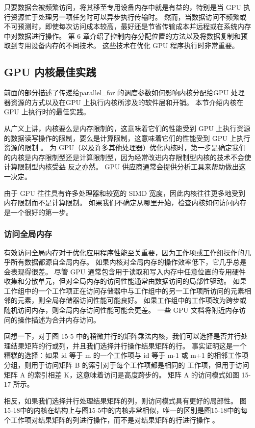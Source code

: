 只要数据会被频繁访问，将其移至专用设备内存中就是有益的，特别是当 GPU 执行资源忙于处理另一项任务时可以异步执行传输时。 然而，当数据访问不频繁或不可预测时，即使每次访问成本较高，最好还是节省传输成本并远程或在系统内存中对数据进行操作。 第 6 章介绍了控制内存分配位置的方法以及将数据复制和预取到专用设备内存的不同技术。 这些技术在优化 GPU 程序执行时非常重要。

\subsection{GPU 内核最佳实践}
前面的部分描述了传递给parallel\_for 的调度参数如何影响内核分配给GPU 处理器资源的方式以及在GPU 上执行内核所涉及的软件层和开销。 本节介绍内核在 GPU 上执行时的最佳实践。

从广义上讲，内核要么是内存限制的，这意味着它们的性能受到 GPU 上执行资源的数据读写操作的限制，要么是计算限制，这意味着它们的性能受到 GPU 上执行资源的限制 。 为 GPU（以及许多其他处理器）优化内核时，第一步是确定我们的内核是内存限制型还是计算限制型，因为经常改进内存限制型内核的技术不会使计算限制型内核受益 反之亦然。 GPU 供应商通常会提供分析工具来帮助做出这一决定。

由于 GPU 往往具有许多处理器和较宽的 SIMD 宽度，因此内核往往更多地受到内存限制而不是计算限制。 如果我们不确定从哪里开始，检查内核如何访问内存是一个很好的第一步。

\subsubsection{访问全局内存}
有效访问全局内存对于优化应用程序性能至关重要，因为工作项或工作组操作的几乎所有数据都源自全局内存。 如果内核对全局内存的操作效率低下，它几乎总是会表现得很差。 尽管 GPU 通常包含用于读取和写入内存中任意位置的专用硬件收集和分散单元，但对全局内存的访问性能通常由数据访问的局部性驱动。 如果工作组中的一个工作项正在访问存储器中与工作组中的另一工作项所访问的元素相邻的元素，则全局存储器访问性能可能良好。 如果工作组中的工作项改为跨步或随机访问内存，则全局内存访问性能可能会更差。 一些 GPU 文档将附近内存访问的操作描述为合并内存访问。

回想一下，对于图 15-5 中的稍微并行的矩阵乘法内核，我们可以选择是否并行处理结果矩阵的行或列，并且我们选择并行操作结果矩阵的行。 事实证明这是一个糟糕的选择：如果 id 等于 m 的一个工作项与 id 等于 m-1 或 m+1 的相邻工作项分组，则用于访问矩阵 B 的索引对于每个工作项都是相同的 工作项，但用于访问矩阵 A 的索引相差 K，这意味着访问是高度跨步的。 矩阵 A 的访问模式如图 15-17 所示。

相反，如果我们选择并行处理结果矩阵的列，则访问模式具有更好的局部性。 图15-18中的内核在结构上与图15-5中的内核非常相似，唯一的区别是图15-18中的每个工作项对结果矩阵的列进行操作，而不是对结果矩阵的行进行操作 。

